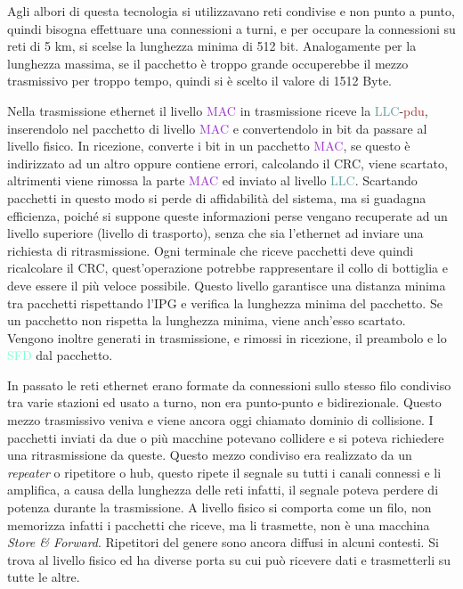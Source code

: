 \documentclass{article}
\numberwithin{equation}{subsection}
\begin{document}
Agli albori di questa tecnologia si utilizzavano reti condivise e non punto a punto, quindi bisogna effettuare una connessioni a turni, e per occupare la connessioni su reti di 5 km, si scelse la lunghezza minima di 512 bit. 
Analogamente per la lunghezza massima, se il pacchetto è troppo grande occuperebbe il mezzo trasmissivo per troppo tempo, quindi si è scelto il valore di 1512 Byte. 


Nella trasmissione ethernet il livello \textcolor{DarkOrchid}{MAC} in trasmissione riceve la \textcolor{CadetBlue}{LLC}-\textcolor{Brown}{pdu}, inserendolo nel pacchetto di livello \textcolor{DarkOrchid}{MAC} e convertendolo in bit da passare al livello fisico. In ricezione, converte i bit in un pacchetto 
\textcolor{DarkOrchid}{MAC}, se questo è indirizzato ad un altro oppure contiene errori, calcolando il CRC, viene scartato, altrimenti viene rimossa la parte \textcolor{DarkOrchid}{MAC} ed inviato al livello \textcolor{CadetBlue}{LLC}. 
Scartando pacchetti in questo modo si perde di affidabilità del sistema, ma si guadagna efficienza, poiché si suppone queste informazioni perse vengano recuperate ad un livello superiore (livello di trasporto), 
senza che sia l'ethernet ad inviare una richiesta di ritrasmissione. Ogni terminale che riceve pacchetti deve quindi ricalcolare il CRC, quest'operazione potrebbe rappresentare il collo di bottiglia e deve essere il 
più veloce possibile. Questo livello garantisce una distanza minima tra pacchetti rispettando l'IPG e verifica la lunghezza minima del pacchetto. Se un pacchetto non rispetta la lunghezza minima, viene anch'esso 
scartato. Vengono inoltre generati in trasmissione, e rimossi in ricezione, il preambolo e lo \textcolor{Aquamarine}{SFD} dal pacchetto. 



In passato le reti ethernet erano formate da connessioni sullo stesso filo condiviso tra varie stazioni ed usato a turno, non era punto-punto e bidirezionale. Questo mezzo trasmissivo veniva e viene ancora oggi chiamato dominio di collisione. I pacchetti inviati 
da due o più macchine potevano collidere e si poteva richiedere una ritrasmissione da queste. Questo mezzo condiviso era realizzato da un \textit{repeater} o ripetitore o hub, questo ripete il segnale su tutti i canali connessi e li 
amplifica, a causa della lunghezza delle reti infatti, il segnale poteva perdere di potenza durante la trasmissione. A livello fisico si comporta come un filo, non memorizza infatti i pacchetti che riceve, 
ma li trasmette, non è una macchina \textit{Store \& Forward}. Ripetitori del genere sono ancora diffusi in alcuni contesti. 
Si trova al livello fisico ed ha diverse porta su cui può ricevere dati e trasmetterli su tutte le altre. 
\end{document}

